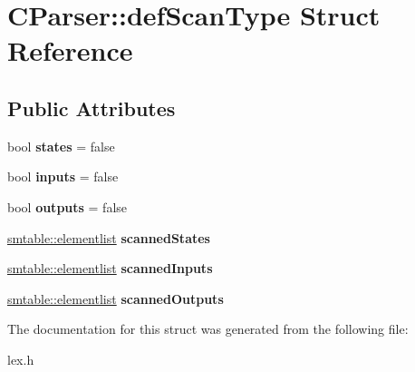 \hypertarget{struct_c_parser_1_1def_scan_type}{}\section{C\+Parser\+:\+:def\+Scan\+Type Struct Reference}
\label{struct_c_parser_1_1def_scan_type}
\subsection*{Public Attributes}
\begin{DoxyCompactItemize}
\item 
\mbox{\label{struct_c_parser_1_1def_scan_type_a5ef404f5728a4f4c7273b53458031fce}} 
bool {\bfseries states} = false
\item 
\mbox{\label{struct_c_parser_1_1def_scan_type_a24df85b06d551245612b9863151a209c}} 
bool {\bfseries inputs} = false
\item 
\mbox{\label{struct_c_parser_1_1def_scan_type_a8e9ab383e6febb9140fd5aae1e40d96a}} 
bool {\bfseries outputs} = false
\item 
\mbox{\label{struct_c_parser_1_1def_scan_type_aacf09550b0d1279b02b73194d22275d1}} 
\mbox{\hyperlink{classsmtable_a5eb5f5f14b1e52a2bde73255ea71927f}{smtable\+::elementlist}} {\bfseries scanned\+States}
\item 
\mbox{\label{struct_c_parser_1_1def_scan_type_aaad6797130a603091c379db7e47e616d}} 
\mbox{\hyperlink{classsmtable_a5eb5f5f14b1e52a2bde73255ea71927f}{smtable\+::elementlist}} {\bfseries scanned\+Inputs}
\item 
\mbox{\label{struct_c_parser_1_1def_scan_type_a94fabbf316b49aeb05443759943ad994}} 
\mbox{\hyperlink{classsmtable_a5eb5f5f14b1e52a2bde73255ea71927f}{smtable\+::elementlist}} {\bfseries scanned\+Outputs}
\end{DoxyCompactItemize}


The documentation for this struct was generated from the following file\+:\begin{DoxyCompactItemize}
\item 
lex.\+h\end{DoxyCompactItemize}
